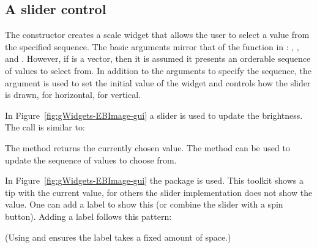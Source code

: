 \subsection{A slider control}
\label{sec:gWidgets-slider-control}

The  constructor creates a scale widget that allows the
user to select a value from the specified sequence.  The basic
arguments mirror that of the  function in \R:
, , and
.  However, if  is a vector, then it is
assumed it presents an orderable sequence of values to select from.
In addition to the arguments to specify the sequence, the argument
 is used to set the initial value of the
widget and  controls how the slider is
drawn,  for horizontal,  for vertical.

In Figure~\ref{fig:gWidgets-EBImage-gui} a slider is used to update
the brightness. The call is similar to:
\begin{Schunk}
\end{Schunk}

The  method returns the currently chosen
value. The \method{[\ASSIGN}{gslider} method can be used to update the
sequence of values to choose from. 


In Figure~\ref{fig:gWidgets-EBImage-gui} the 
package is used. This toolkit shows a tip with the current value, for
others the slider implementation does not show the value. One can
add a label to show this (or combine the slider with a spin
button). Adding a label follows this pattern:

\begin{Schunk}
\end{Schunk}
(Using  and  ensures the label takes a
fixed amount of space.)


